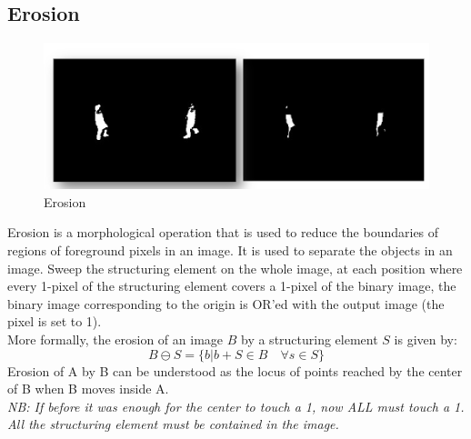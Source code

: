 \subsection{Erosion}
\begin{figure}[h]
    \centering
    \includegraphics[scale=0.5]{Figures/Erosion.png}
    \caption{Erosion}
    \label{fig:enter-label}
\end{figure}
Erosion is a morphological operation that is used to reduce the boundaries of regions of foreground pixels in an image. It is used to separate the objects in an image.
Sweep the structuring element on the whole image, at each position where every 1-pixel of the structuring element covers a 1-pixel of the binary image, the binary image corresponding to the origin is OR’ed with the output image (the pixel is set to 1). 
\\More formally, the erosion of an image $B$ by a structuring element $S$ is given by:
\[
    B \ominus S = \{b | b + S \in B \quad \forall s \in S\} 
\]
Erosion of A by B can be understood as the locus of points reached by the center of B when B moves inside A.
\\
\textit{NB: If before it was enough for the center to touch a 1, now ALL must touch a 1. All the structuring element must be contained in the image.}
